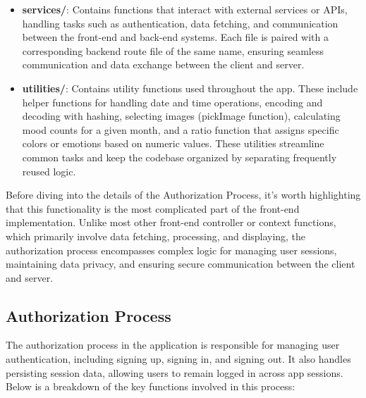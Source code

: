 \begin{itemize}
    \item \textbf{services/}: Contains functions that interact with external services or APIs, handling tasks such as authentication, data fetching, and communication between the front-end and back-end systems. Each file is paired with a corresponding backend route file of the same name, ensuring seamless communication and data exchange between the client and server.

    \item \textbf{utilities/}: Contains utility functions used throughout the app. These include helper functions for handling date and time operations, encoding and decoding with hashing, selecting images (pickImage function), calculating mood counts for a given month, and a ratio function that assigns specific colors or emotions based on numeric values. These utilities streamline common tasks and keep the codebase organized by separating frequently reused logic.
\end{itemize}

\noindent Before diving into the details of the Authorization Process, it’s worth highlighting that this functionality is the most complicated part of the front-end implementation. Unlike most other front-end controller or context functions, which primarily involve data fetching, processing, and displaying, the authorization process encompasses complex logic for managing user sessions, maintaining data privacy, and ensuring secure communication between the client and server.

\subsection{Authorization Process}

The authorization process in the application is responsible for managing user authentication, including signing up, signing in, and signing out. It also handles persisting session data, allowing users to remain logged in across app sessions. Below is a breakdown of the key functions involved in this process:

